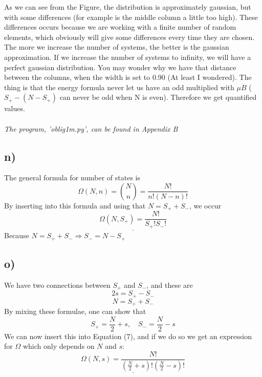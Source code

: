 \documentclass{scrartcl}
\begin{document}
\par\vspace{3mm} As we can see from the Figure, the distribution is approximately gaussian, but with some differences (for example is the middle column a little too high). These differences occurs because we are working with a finite number of random elements, which obviously will give some differences every time they are chosen. The more we increase the number of systems, the better is the gaussian approximation. If we increase the number of systems to infinity, we will have a perfect gaussian distribution. You may wonder why we have that distance between the columns, when the width is set to 0.90 (At least I wondered). The thing is that the energy formula never let us have an odd multiplied with $\mu B$ ($S_+-(N-S_+)$ can never be odd when N is even). Therefore we get quantified values.
 \\\\ \textit{The program, 'oblig1m.py', can be found in Appendix B}
 
\subsection*{n)}
The general formula for number of states is
$$\Omega(N,n)=\binom{N}{n}=\frac{N!}{n!(N-n)!}$$
By inserting into this formula and using that $N=S_++S_-$, we occur
\begin{equation}
\underline{\Omega(N,S_+)=\frac{N!}{S_+!S_-!}}
\end{equation}
Because $N=S_++S_-\Rightarrow S_-=N-S_+$

\subsection*{o)}
We have two connections between $S_+$ and $S_-$, and these are
$$2s=S_+-S_-$$
$$N=S_++S_-$$
By mixing these formulae, one can show that
$$S_+=\frac{N}{2}+s,\quad S_-=\frac{N}{2}-s$$
We can now insert this into Equation (7), and if we do so we get an expression for $\Omega$ which only depends on $N$ and $s$:
\begin{equation}
\underline{\Omega(N,s)=\frac{N!}{(\frac{N}{2}+s)!(\frac{N}{2}-s)!}}
\end{equation}
\end{document}
